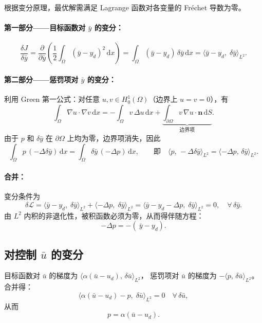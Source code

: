 \documentclass[UTF8, 12pt]{ctexart}
\begin{document}
根据变分原理，最优解需满足 Lagrange 函数对各变量的 Fréchet 导数为零。

\paragraph{第一部分——目标函数对 $\bar{y}$ 的变分：}
\[
  \frac{\delta J}{\delta\bar{y}}
  = \frac{\partial}{\partial\bar{y}}\!\left(\frac{1}{2}\int_\Omega(\bar{y}-y_d)^2\,\mathrm{d}x\right)
  = \int_\Omega(\bar{y}-y_d)\,\delta\bar{y}\,\mathrm{d}x
  = \langle\bar{y}-y_d,\;\delta\bar{y}\rangle_{L^2}.
\]

\paragraph{第二部分——惩罚项对 $\bar{y}$ 的变分：}
利用 Green 第一公式：对任意 $u,v\in H_0^1(\Omega)$（边界上 $u=v=0$），有
\begin{equation}
  \int_\Omega \nabla u \cdot \nabla v\,\mathrm{d}x
  = -\int_\Omega v\,\Delta u\,\mathrm{d}x
  + \underbrace{\int_{\partial\Omega} v\,\nabla u \cdot \mathbf{n}\,\mathrm{d}S}_{\text{边界项}}.
  \label{eq:green}
\end{equation}
由于 $p$ 和 $\delta\bar{y}$ 在 $\partial\Omega$ 上均为零，边界项消失，因此
\[
  \int_\Omega p\,(-\Delta\delta\bar{y})\,\mathrm{d}x
  = \int_\Omega \delta\bar{y}\,(-\Delta p)\,\mathrm{d}x,
  \qquad\text{即}\quad
  \langle p,\,-\Delta\delta\bar{y}\rangle_{L^2}
  = \langle -\Delta p,\,\delta\bar{y}\rangle_{L^2}.
\]

\paragraph{合并：} 变分条件为
\[
  \delta\mathcal{L}
  = \langle\bar{y}-y_d,\;\delta\bar{y}\rangle_{L^2}
  + \langle -\Delta p,\;\delta\bar{y}\rangle_{L^2}
  = \langle\bar{y}-y_d - \Delta p,\;\delta\bar{y}\rangle_{L^2}
  = 0,
  \quad\forall\,\delta\bar{y}.
\]
由 $L^2$ 内积的非退化性，被积函数必须为零，从而得伴随方程：
\begin{equation}
  \boxed{-\Delta p = -(\ \bar{y} - y_d).}
  \label{eq:adjoint}
\end{equation}

\subsection{对控制 $\bar{u}$ 的变分}

目标函数对 $\bar{u}$ 的梯度为 $\langle\alpha(\bar{u}-u_d),\,\delta\bar{u}\rangle_{L^2}$，
惩罚项对 $\bar{u}$ 的梯度为 $-\langle p,\,\delta\bar{u}\rangle_{L^2}$。
合并得：
\[
  \langle\alpha(\bar{u}-u_d) - p,\;\delta\bar{u}\rangle_{L^2} = 0
  \quad\forall\,\delta\bar{u},
\]
从而
\begin{equation}
  p = \alpha(\bar{u} - u_d).
  \label{eq:control-eq}
\end{equation}
\end{document}

